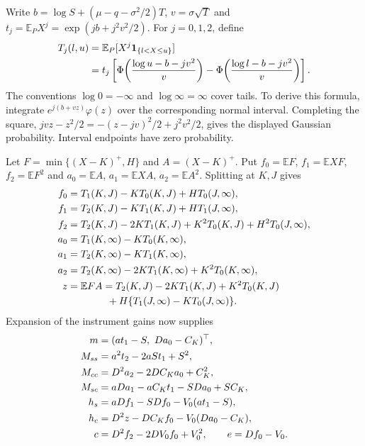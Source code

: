\documentclass[11pt]{article}
\begin{document}
Write $b=\log S+(\mu-q-\sigma^2/2)T$, $v=\sigma\sqrt T$ and
$t_j=\mathbb E_PX^j=\exp(jb+j^2v^2/2)$. For $j=0,1,2$, define
\begin{align}
 T_j(l,u)&=\mathbb E_P[X^j{\bf1}_{\{l<X\leq u\}}]\notag\\
 &=t_j\left[
 \Phi\!\left(\frac{\log u-b-jv^2}{v}\right)-
 \Phi\!\left(\frac{\log l-b-jv^2}{v}\right)\right].
 \label{eq:h-truncated-moment}
\end{align}
The conventions $\log0=-\infty$ and $\log\infty=\infty$ cover tails.
To derive this formula, integrate $e^{j(b+vz)}\varphi(z)$ over the
corresponding normal interval. Completing the square,
$jvz-z^2/2=-(z-jv)^2/2+j^2v^2/2$, gives the displayed Gaussian
probability. Interval endpoints have zero probability.

Let $F=\min\{(X-K)^+,H\}$ and $A=(X-K)^+$. Put
$f_0=\mathbb EF$, $f_1=\mathbb EXF$, $f_2=\mathbb EF^2$ and
$a_0=\mathbb EA$, $a_1=\mathbb EXA$, $a_2=\mathbb EA^2$.
Splitting at $K,J$ gives
\begin{align}
 f_0&=T_1(K,J)-KT_0(K,J)+HT_0(J,\infty),\notag\\
 f_1&=T_2(K,J)-KT_1(K,J)+HT_1(J,\infty),\notag\\
 f_2&=T_2(K,J)-2KT_1(K,J)+K^2T_0(K,J)+H^2T_0(J,\infty),
 \label{eq:h-capped-moments}\\
 a_0&=T_1(K,\infty)-KT_0(K,\infty),\notag\\
 a_1&=T_2(K,\infty)-KT_1(K,\infty),\notag\\
 a_2&=T_2(K,\infty)-2KT_1(K,\infty)+K^2T_0(K,\infty),
 \label{eq:h-call-moments}\\
 z&=\mathbb EFA=T_2(K,J)-2KT_1(K,J)+K^2T_0(K,J)\notag\\
 &\hspace{14mm}+H\{T_1(J,\infty)-KT_0(J,\infty)\}.
 \label{eq:h-payoff-cross-moment}
\end{align}
Expansion of the instrument gains now supplies
\begin{align}
 m&=(at_1-S,\ Da_0-C_K)^\top,\notag\\
 M_{ss}&=a^2t_2-2aSt_1+S^2,\notag\\
 M_{cc}&=D^2a_2-2DC_Ka_0+C_K^2,\notag\\
 M_{sc}&=aDa_1-aC_Kt_1-SDa_0+SC_K,\label{eq:h-gain-moments}\\
 h_s&=aDf_1-SDf_0-V_0(at_1-S),\notag\\
 h_c&=D^2z-DC_Kf_0-V_0(Da_0-C_K),\notag\\
 c&=D^2f_2-2DV_0f_0+V_0^2,\qquad e=Df_0-V_0.
 \label{eq:h-loss-moments}
\end{align}
\end{document}
